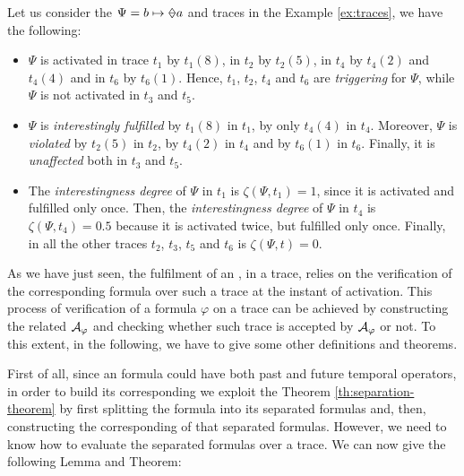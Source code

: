 \begin{example}\label{ex:janus-interest}
Let us consider the \rcon\xspace $\Psi = b \mapsto \Once a$ and traces in the Example \ref{ex:traces}, we have the following:
\begin{itemize}
\item $\Psi$ is activated in trace $t_1$ by $t_1(8)$, in $t_2$ by $t_2(5)$, in $t_4$ by $t_4(2)$ and $t_4(4)$ and in $t_6$ by $t_6(1)$. Hence, $t_1$, $t_2$, $t_4$ and $t_6$ are \textit{triggering} for $\Psi$, while $\Psi$ is not activated in $t_3$ and $t_5$.
\item $\Psi$ is \textit{interestingly fulfilled} by $t_1(8)$ in $t_1$, by only $t_4(4)$ in $t_4$. Moreover, $\Psi$ is \textit{violated} by $t_2(5)$ in $t_2$, by $t_4(2)$ in $t_4$ and by $t_6(1)$ in $t_6$. Finally, it is \textit{unaffected} both in $t_3$ and $t_5$. 
\item The \textit{interestingness degree} of $\Psi$ in $t_1$ is $\zeta(\Psi, t_1) = 1$, since it is activated and fulfilled only once. Then, the \textit{interestingness degree} of $\Psi$ in $t_4$ is $\zeta(\Psi, t_4) = 0.5$ because it is activated twice, but fulfilled only once. Finally, in all the other traces $t_2$, $t_3$, $t_5$ and $t_6$ is $\zeta(\Psi, t) = 0$.
\end{itemize}
\end{example}
As we have just seen, the fulfilment of an \rcon\xspace, in a trace, relies on the verification of the corresponding \LTLp formula over such a trace at the instant of activation. This process of verification of a formula $\varphi$ on a trace can be achieved by constructing the related \DFA $\mathcal{A}_{\varphi}$ and checking whether such trace is accepted by $\mathcal{A}_{\varphi}$ or not. To this extent, in the following, we have to give some other definitions and theorems.

First of all, since an \LTLp formula could have both past and future temporal operators, in order to build its corresponding \DFA we exploit the Theorem \ref{th:separation-theorem} by first splitting the \LTLp formula into its separated formulas and, then, constructing the corresponding \DFAs of that separated formulas. However, we need to know how to evaluate the separated formulas over a trace. We can now give the following Lemma and Theorem:

